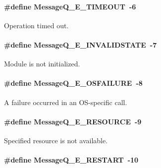 \paragraph[{MessageQ\_\-E\_\-TIMEOUT}]{\setlength{\rightskip}{0pt plus 5cm}\#define MessageQ\_\-E\_\-TIMEOUT~-\/6}\hfill\label{_message_q_8h_a7aa8fb2d3e83b747e767f1c117a657c7}


Operation timed out. 

\paragraph[{MessageQ\_\-E\_\-INVALIDSTATE}]{\setlength{\rightskip}{0pt plus 5cm}\#define MessageQ\_\-E\_\-INVALIDSTATE~-\/7}\hfill\label{_message_q_8h_a52b7b795b2970498c39d71647a11685b}


Module is not initialized. 

\paragraph[{MessageQ\_\-E\_\-OSFAILURE}]{\setlength{\rightskip}{0pt plus 5cm}\#define MessageQ\_\-E\_\-OSFAILURE~-\/8}\hfill\label{_message_q_8h_a8a0891b652f3cd1a15ebdd7a4d030d09}


A failure occurred in an OS-\/specific call. 

\paragraph[{MessageQ\_\-E\_\-RESOURCE}]{\setlength{\rightskip}{0pt plus 5cm}\#define MessageQ\_\-E\_\-RESOURCE~-\/9}\hfill\label{_message_q_8h_af713143259d456df28379635afbbb398}


Specified resource is not available. 

\paragraph[{MessageQ\_\-E\_\-RESTART}]{\setlength{\rightskip}{0pt plus 5cm}\#define MessageQ\_\-E\_\-RESTART~-\/10}\hfill\label{_message_q_8h_a955261f8c7412eab163bff9349591927}



